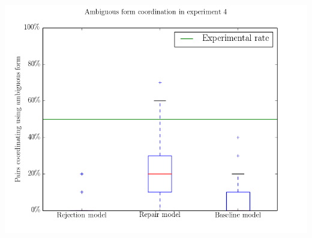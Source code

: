 \documentclass[12pt,a4paper]{article}
\begin{document}
\begin{center}
\includegraphics[width=\textwidth]{ambi_coord_exp4.png}
\end{center}
\end{document}

